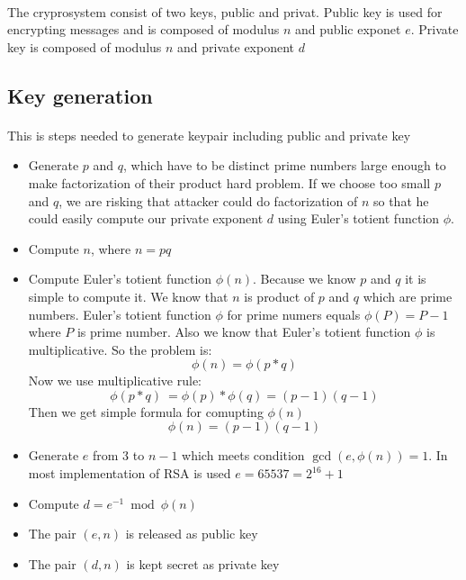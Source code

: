 \documentclass[thesis=B,english]{FITthesis}[2012/10/20]
\begin{document}
{\paragraph*{}
{The cryprosystem consist of two keys, public and privat. Public key is used for encrypting messages and is composed of modulus \(n\) and public exponet \(e\). Private key is composed of modulus \(n\) and private exponent \(d\)}



\subsection{Key generation}
\paragraph*{}
{This is steps needed to generate keypair including public and private key}
\begin{itemize}
 \item Generate \(p\) and \(q\), which have to be distinct prime numbers large enough to make factorization of their product hard problem. If we choose too small \(p\) and \(q\), we are risking that attacker could do factorization of \(n\) so that he could easily compute our private exponent \(d\) using Euler's totient function \(\phi\).
 \item Compute \(n\), where \(n = p  q\)
 \item Compute Euler's totient function \(\phi(n)\). Because we know \(p\) and \(q\) it is simple to compute it. We know that  \(n\) is product of \(p\) and \(q\) which are prime numbers. Euler's totient function \(\phi\) for prime numers equals \(\phi(P) = P -1\) where \(P\) is prime number. Also we know that Euler's totient function \(\phi\) is multiplicative. So the problem is:
 \[\phi(n) = \phi(p*q)\]
 Now we use multiplicative rule:
 \[\phi(p*q)\ = \phi(p)* \phi(q) = (p - 1)(q - 1)\]
 Then we get simple formula for comupting \(\phi(n)\)
 \[\phi(n) = (p - 1)(q - 1)\]
 \item Generate \(e\) from 3 to  \(n - 1\) which meets condition \(\gcd(e,\phi(n)) = 1\). In most implementation of RSA is used \(e = 65537 = 2^{16} + 1\)
 \item Compute \(d = e^{-1}\bmod{\phi(n)} \)
 \item The pair \((e,n)\) is released as public key
 \item The pair \((d,n)\) is kept secret as private key
\end{itemize}

}
\end{document}
